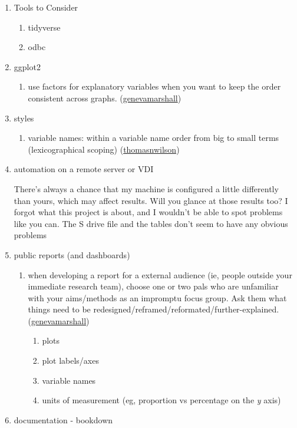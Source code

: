 \documentclass[
]{book}
\providecommand{\tightlist}{%
  \setlength{\itemsep}{0pt}\setlength{\parskip}{0pt}}
\begin{document}
\begin{enumerate}
\def\labelenumi{\arabic{enumi}.}
\item
  Tools to Consider

  \begin{enumerate}
  \def\labelenumii{\arabic{enumii}.}
  \tightlist
  \item
    tidyverse
  \item
    odbc
  \end{enumerate}
\item
  ggplot2

  \begin{enumerate}
  \def\labelenumii{\arabic{enumii}.}
  \tightlist
  \item
    use factors for explanatory variables when you want to keep the order consistent across graphs. (\href{https://github.com/genevamarshall}{genevamarshall})
  \end{enumerate}
\item
  styles

  \begin{enumerate}
  \def\labelenumii{\arabic{enumii}.}
  \tightlist
  \item
    variable names: within a variable name order from big to small terms (lexicographical scoping) (\href{https://github.com/thomasnwilson}{thomasnwilson})
  \end{enumerate}
\item
  automation on a remote server or VDI

  There's always a chance that my machine is configured a little differently than yours, which may affect results. Will you glance at those results too? I forgot what this project is about, and I wouldn't be able to spot problems like you can. The S drive file and the tables don't seem to have any obvious problems
\item
  public reports (and dashboards)

  \begin{enumerate}
  \def\labelenumii{\arabic{enumii}.}
  \tightlist
  \item
    when developing a report for a external audience (ie, people outside your immediate research team), choose one or two pals who are unfamiliar with your aims/methods as an impromptu focus group. Ask them what things need to be redesigned/reframed/reformated/further-explained. (\href{https://github.com/genevamarshall}{genevamarshall})

    \begin{enumerate}
    \def\labelenumiii{\arabic{enumiii}.}
    \tightlist
    \item
      plots
    \item
      plot labels/axes
    \item
      variable names
    \item
      units of measurement (eg, proportion vs percentage on the \emph{y} axis)
    \end{enumerate}
  \end{enumerate}
\item
  documentation - bookdown


\end{enumerate}
\end{document}
